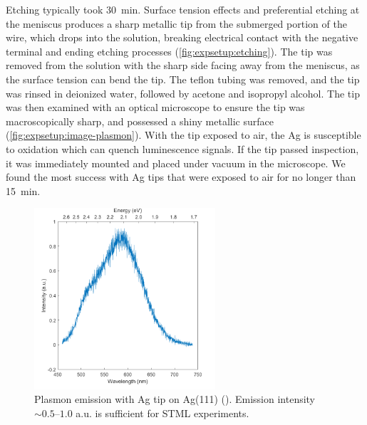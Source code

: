 Etching typically took \SI{30}{min}. Surface tension effects and preferential etching at the meniscus produces a sharp metallic tip from the submerged portion of the wire, which drops into the solution, breaking electrical contact with the negative terminal and ending etching processes (\autoref{fig:expsetup:etching}). The tip was removed from the solution with the sharp side facing away from the meniscus, as the surface tension can bend the tip. The teflon tubing was removed, and the tip was rinsed in deionized water, followed by acetone and isopropyl alcohol. The tip was then examined with an optical microscope to ensure the tip was macroscopically sharp, and possessed a shiny metallic surface (\autoref{fig:expsetup:image-plasmon}). With the tip exposed to air, the Ag is susceptible to oxidation which can quench luminescence signals. If the tip passed inspection, it was immediately mounted and placed under vacuum in the microscope. We found the most success with Ag tips that were exposed to air for no longer than \SI{15}{min}.

\begin{figure}[H]
    \centering
    
    \includegraphics[width=0.6\textwidth]{pictures/ag111_plasmon.png}
    \caption[Plasmon emission with Ag tip on Ag(111) (). Emission intensity $\sim 0.5$--$1.0$ a.u. is sufficient for STML experiments.]{Plasmon emission with Ag tip on Ag(111) (). Emission intensity $\sim 0.5$--$1.0$ a.u. is sufficient for STML experiments.\footnotemark}
    
    \label{fig:expsetup:plasmon}
\end{figure}


